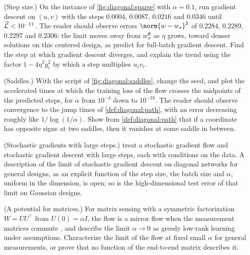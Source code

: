 \begin{refsection}
\begin{exercises}
\item \simulation (Step size.) On the instance of \cref{fig:diagonal:sparse} with $\alpha=0.1$, run gradient descent on $(u,v)$ with the steps $0.0004$, $0.0087$, $0.0216$ and $0.0346$ until $\widehat{\mathcal{L}}<10^{-11}$. The reader should observe errors $\norm{w-w_\star}^2$ of $0.2284$, $0.2289$, $0.2297$ and $0.2306$: the limit moves away from $w^\Phi_\alpha$ as $\eta$ grows, toward denser solutions on this centered design, as \textcite{EvenEtAl2023} predict for full-batch gradient descent. Find the step at which gradient descent diverges, and explain the trend using the factor $1-4\eta^2g_i^2$ by which a step multiplies $u_iv_i$. \label{ex:diagonal:stepsize}

\item \simulation (Saddles.) With the script of \cref{fig:diagonal:saddles}, change the seed, and plot the accelerated times at which the training loss of the flow crosses the midpoints of the predicted steps, for $\alpha$ from $10^{-4}$ down to $10^{-24}$. The reader should observe convergence to the jump times of \cref{def:diagonal:path}, with an error decreasing roughly like $1/\log(1/\alpha)$. Show from \cref{def:diagonal:path} that if a coordinate has opposite signs at two saddles, then it vanishes at some saddle in between. \label{ex:diagonal:saddlesim}

\item \research (Stochastic gradients with large steps.) \Textcite{PesmePillaudVivienFlammarion2021} treat a stochastic gradient flow and \textcite{EvenEtAl2023} stochastic gradient descent with large steps, each with conditions on the data. A description of the limit of stochastic gradient descent on diagonal networks for general designs, as an explicit function of the step size, the batch size and $\alpha$, uniform in the dimension, is open; so is the high-dimensional test error of that limit on Gaussian designs. \label{ex:diagonal:sgd}

\item \research (A potential for matrices.) For matrix sensing with a symmetric factorization $W=UU^\top$ from $U(0)=\alpha I$, the flow is a mirror flow when the measurement matrices commute \parencite{GunasekarEtAl2017}, and \textcite{LiLuoLyu2021} describe the limit $\alpha\to0$ as greedy low-rank learning under assumptions. Characterize the limit of the flow at fixed small $\alpha$ for general measurements, or prove that no function of the end-to-end matrix describes it. \label{ex:diagonal:matrix}
\end{exercises}


\end{refsection}
